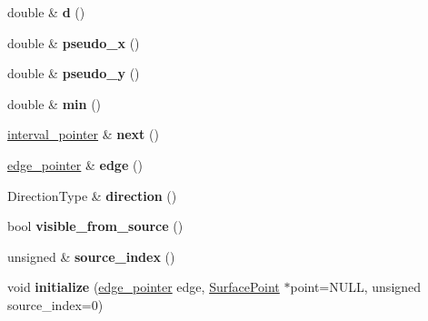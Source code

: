 \begin{DoxyCompactItemize}
\item 
\hypertarget{classgeodesic_1_1_interval_ace2de9508089066782c6661b4dfdb220}{}double \& {\bfseries d} ()\label{classgeodesic_1_1_interval_ace2de9508089066782c6661b4dfdb220}

\item 
\hypertarget{classgeodesic_1_1_interval_ad97ef7bf3b77eb79719974ecb6a4b64c}{}double \& {\bfseries pseudo\+\_\+x} ()\label{classgeodesic_1_1_interval_ad97ef7bf3b77eb79719974ecb6a4b64c}

\item 
\hypertarget{classgeodesic_1_1_interval_a910c68345f1148d3f1c786ea122964be}{}double \& {\bfseries pseudo\+\_\+y} ()\label{classgeodesic_1_1_interval_a910c68345f1148d3f1c786ea122964be}

\item 
\hypertarget{classgeodesic_1_1_interval_a3805393c224c4cc767ed5a1fd4860744}{}double \& {\bfseries min} ()\label{classgeodesic_1_1_interval_a3805393c224c4cc767ed5a1fd4860744}

\item 
\hypertarget{classgeodesic_1_1_interval_a4c496edeb123149852a18a3e945e6ee8}{}\hyperlink{classgeodesic_1_1_interval}{interval\+\_\+pointer} \& {\bfseries next} ()\label{classgeodesic_1_1_interval_a4c496edeb123149852a18a3e945e6ee8}

\item 
\hypertarget{classgeodesic_1_1_interval_a74bad8b35168b14b2cfe72ca29411dce}{}\hyperlink{classgeodesic_1_1_edge}{edge\+\_\+pointer} \& {\bfseries edge} ()\label{classgeodesic_1_1_interval_a74bad8b35168b14b2cfe72ca29411dce}

\item 
\hypertarget{classgeodesic_1_1_interval_a116a7f1298cd2f08a10612f6cf8f353a}{}Direction\+Type \& {\bfseries direction} ()\label{classgeodesic_1_1_interval_a116a7f1298cd2f08a10612f6cf8f353a}

\item 
\hypertarget{classgeodesic_1_1_interval_a677eff57411bbcfd38fc32e3a0155f97}{}bool {\bfseries visible\+\_\+from\+\_\+source} ()\label{classgeodesic_1_1_interval_a677eff57411bbcfd38fc32e3a0155f97}

\item 
\hypertarget{classgeodesic_1_1_interval_a5e30261b5b844ed85e9e4ac4971a5355}{}unsigned \& {\bfseries source\+\_\+index} ()\label{classgeodesic_1_1_interval_a5e30261b5b844ed85e9e4ac4971a5355}

\item 
\hypertarget{classgeodesic_1_1_interval_a9e0e0bff3b09be45d7bc6f3dcfda3c36}{}void {\bfseries initialize} (\hyperlink{classgeodesic_1_1_edge}{edge\+\_\+pointer} edge, \hyperlink{classgeodesic_1_1_surface_point}{Surface\+Point} $\ast$point=N\+U\+L\+L, unsigned source\+\_\+index=0)\label{classgeodesic_1_1_interval_a9e0e0bff3b09be45d7bc6f3dcfda3c36}

\end{DoxyCompactItemize}
